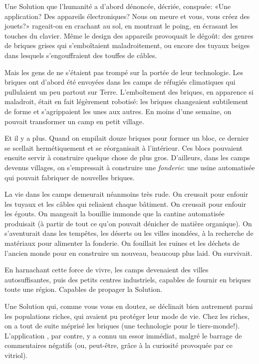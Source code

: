 Une Solution que l'humanité a d'abord dénoncée, décriée, conspuée: «Une
application? Des appareils électroniques? Nous on meure et vous, vous créez des
jouets?» rageait-on en crachant au sol, en montrant le poing, en écrasant
les touches du clavier.  Même le design des appareils provoquait le
dégoût: des genres de briques grises qui s'emboîtaient mala\-droi\-tement, ou
encore des tuyaux beiges dans lesquels s'engouffraient des touffes
de câbles.


Mais les gens de \nomProjet{} ne s'étaient pas trompé sur la portée de
leur technologie.
Les briques ont d'abord été envoyées dans les
camps de réfugiés climatiques qui pullu\-laient un peu partout sur Terre.
L'emboît\-e\-ment des briques, en apparence si maladroit,
était en fait légèrement robotisé: les briques changeaient subtilement de
forme et s'a\-grip\-paient les unes aux autres. En moins d'une semaine, on
pouvait transfor\-mer un camp en petit village.

Et il y a plus. Quand on empilait douze briques pour former un bloc, ce
dernier se scellait hermétiquement et se réorganisait à l'intérieur. Ces
blocs pouvaient ensuite servir à construire quelque chose de plus gros.
D'ailleurs, dans les camps devenus villages, on
s'empressait à construire une \textit{fonderie}: une usine automatisée qui
pouvait fabriquer de nouvelles briques.

La vie dans les camps demeurait néanmoins très rude. On creusait pour
enfouir les tuyaux et les câbles qui reliaient chaque bâtiment. On creusait
pour enfouir les égouts.  On mangeait la bouillie immonde que la cantine
automatisée produisait (à partir de tout ce qu'on pouvait dénicher de
matière organique).  On s'aven\-turait dans les tempêtes, les déserts ou
les villes inondées, à la recherche de matériaux pour alimenter la
fonderie.  On fouillait les ruines et les déchets de l'ancien monde pour en
construire un nouveau, beaucoup plus laid.
On survivait.

En harnachant cette force de vivre, les camps devenaient
des villes autosuffisantes, puis des petits centres industriels, capables
de fournir en briques toute une région. Capables de propager la
Solution.

Une Solution qui, comme vous vous en doutez, se déclinait bien autrement
parmi les populations riches, qui avaient pu protéger leur
mode de vie.  Chez les riches, on a tout de suite méprisé les briques (une
technologie pour le tiers-monde!). L'application \nomProjet{}, par contre,
y a connu un essor immédiat, malgré le barrage de commentaires négatifs (ou,
peut-être, grâce à la curiosité provoquée par ce vitriol).

